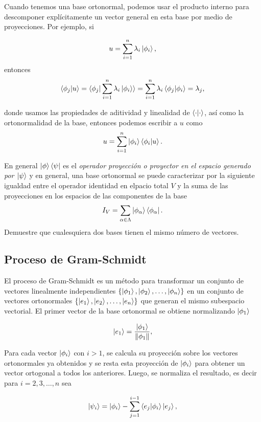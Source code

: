 \documentclass[main.tex]{subfiles}
\begin{document}
Cuando tenemos una base ortonormal, podemos usar el producto interno para descomponer explícitamente un vector general en esta base por medio de proyecciones. Por ejemplo, si

\[
u = \sum_{i=1}^n \lambda_i \ket{\phi_i},
\]
entonces
\[
\braket{\phi_j| u} = \braket{\phi_j| \sum_{i=1}^n \lambda_i \ket{\phi_i}} = \sum_{i=1}^n \lambda_i\braket{\phi_j |\phi_i} = \lambda_j,
\]

donde usamos las propiedades de aditividad y linealidad de \(\braket{\cdot|\cdot}\), así como la ortonormalidad de la base, entonces podemos escribir a \(u\) como
\begin{equation}
u = \sum_{i=1}^n \ket{\phi_i}\braket{\phi_i|u}.
\end{equation}

En general \(\ket{\phi}\bra{\psi}\) es el \emph{operador proyección o proyector en el espacio generado por \(\ket{\psi}\)} y en general, una base ortonormal se puede caracterizar por la siguiente igualdad entre el operador identidad en elpacio total \(V\) y la suma de las proyecciones en los espacios de las componentes de la base
\begin{equation}
I_{V}=\sum_{\alpha\in\Lambda}\ket{\phi_{\alpha}}\bra{\phi_{\alpha}}.
\end{equation}
\exe Demuestre que cualesquiera dos bases tienen el mismo número de vectores.

\subsection{Proceso de Gram-Schmidt}

\noindent El proceso de Gram-Schmidt es un método para transformar un conjunto de vectores linealmente independientes \(\{\ket{\phi_1}, \ket{\phi_2}, \dots, \ket{\phi_n}\}\) en un conjunto de vectores ortonormales \(\{\ket{e_1}, \ket{e_2}, \dots, \ket{e_n}\}\) que generan el mismo subespacio vectorial. El primer vector de la base ortonormal se obtiene normalizando \(\ket{\phi_1}\)

\[
\ket{e_1} = \frac{\ket{\phi_1}}{\Vert\phi_1\Vert},
\]

Para cada vector \(\ket{\phi_i}\) con \(i > 1\), se calcula su proyección sobre los vectores ortonormales ya obtenidos y se resta esta proyección de \(\ket{\phi_i}\) para obtener un vector ortogonal a todos los anteriores. Luego, se normaliza el resultado, es decir para \(i = 2, 3, \dots, n\) sea

\[
\ket{\psi_i} = \ket{\phi_i} - \sum_{j=1}^{i-1} \braket{e_j | \phi_i} \ket{e_j},
\]
\end{document}
